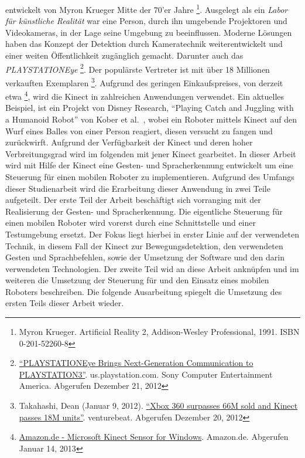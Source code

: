  entwickelt von Myron Krueger Mitte der 70'er Jahre \footnote{Myron Krueger. Artificial Reality 2, Addison-Wesley Professional, 1991. ISBN 0-201-52260-8}.
Ausgelegt als ein \textit{Labor f\"ur k\"unstliche Realit\"at} war eine Person, durch ihn umgebende Projektoren und Videokameras, in der Lage seine Umgebung zu beeinflussen.
Moderne L\"osungen haben das Konzept der Detektion durch Kameratechnik weiterentwickelt und einer weiten \"Offentlichkeit zug\"anglich gemacht. Darunter auch das \textit{PLAYSTATIONEye}
\footnote{\href{http://us.playstation.com/ps3/accessories/playstation-eye-camera-ps3.html}{\enquote{PLAYSTATIONEye Brings Next-Generation Communication to PLAYSTATION3}}. us.playstation.com. Sony Computer Entertainment America. Abgerufen Dezember 21, 2012}.
Der popul\"arste Vertreter ist \textit{} mit \"uber 18 Millionen verkauften Exemplaren
\footnote{Takahashi, Dean (Januar 9, 2012). \href{http://venturebeat.com/2012/01/09/xbox-360-surpassed-66m-sold-and-kinect-has-sold-18m-units/}{\enquote{Xbox 360 surpasses 66M sold and Kinect passes 18M units}}. venturebeat. Abgerufen Dezember 20, 2012}.
\newline
Aufgrund des geringen Einkaufspreises, von derzeit etwa \footnote{\href{http://www.amazon.de/Microsoft-Kinect-Sensor-for-Windows/dp/B0072O6E7K/ref=sr_1_1?ie=UTF8&qid=1358250080&sr=8-1}{Amazon.de - Microsoft Kinect Sensor for Windows}. Amazon.de. Abgerufen Januar 14, 2013}, wird die Kinect in zahlreichen Anwendungen verwendet. Ein aktuelles Beispiel, ist ein Projekt von Disney Research, \enquote{Playing Catch and Juggling with a Humanoid Robot} von Kober et al.~\cite{bib:kober}, wobei ein Roboter mittels Kinect auf den Wurf eines Balles von einer Person reagiert, diesen versucht zu fangen und zur\"uckwirft.
\newline
Aufgrund der Verf\"ugbarkeit der Kinect und deren hoher Verbreitungsgrad wird im folgenden mit jener Kinect gearbeitet.
\newline
In dieser Arbeit wird mit Hilfe der Kinect eine Gesten- und Spracherkennung entwickelt um eine Steuerung f\"ur einen mobilen Roboter zu implementieren.
Aufgrund des Umfangs dieser Studienarbeit wird die Erarbeitung dieser Anwendung in zwei Teile aufgeteilt.
\newline
Der erste Teil der Arbeit besch\"aftigt sich vorranging mit der Realisierung der Gesten- und Spracherkennung.
Die eigentliche Steuerung f\"ur einen mobilen Roboter wird vorerst durch eine Schnittstelle und einer Testumgebung ersetzt.
Der Fokus liegt hierbei in erster Linie auf der verwendeten Technik, in diesem Fall der Kinect zur \gls{Bewegungsdetektion}, den verwendeten Gesten und Sprachbefehlen,
sowie der Umsetzung der Software und den darin verwendeten Technologien.
Der zweite Teil wid an diese Arbeit ankn\"upfen und im weiteren die Umsetzung der Steuerung f\"ur und den Einsatz eines mobilen Roboters beschreiben.
\newline
Die folgende Ausarbeitung spiegelt die Umsetzung des ersten Teils dieser Arbeit wieder.